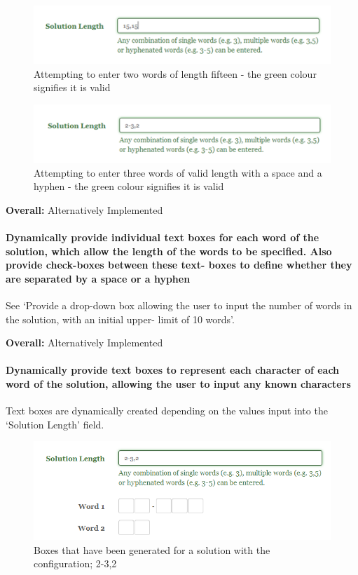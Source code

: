 \begin{figure}[H]
	\centering
	\includegraphics[keepaspectratio=true]{evidence/dropdown2.png}
	\caption{Attempting to enter two words of length fifteen - the green colour 
	signifies it is valid}
\end{figure}

\begin{figure}[H]
	\centering
	\includegraphics[keepaspectratio=true]{evidence/dropdown3.png}
	\caption{Attempting to enter three words of valid length with a space and a 
	hyphen - the green colour signifies it is valid}
\end{figure}

{\bf Overall:} Alternatively Implemented


\paragraph{Dynamically provide individual text boxes for each word of the
solution, which allow the length of the words to be specified. Also provide
check-boxes between these text- boxes to define whether they are separated by a
space or a hyphen}

See `Provide a drop-down box allowing the user to input the number of words in
the solution, with an initial upper- limit of 10 words'.

{\bf Overall:} Alternatively Implemented


\paragraph{Dynamically provide text boxes to represent each character of each
word of the solution, allowing the user to input any known characters}

Text boxes are dynamically created depending on the values input into the
`Solution Length' field.

\begin{figure}[H]
	\centering
	\includegraphics[keepaspectratio=true,scale=0.9]{evidence/dynamicboxes.png}
	\caption{Boxes that have been generated for a solution with the configuration;
	2-3,2}
\end{figure}

